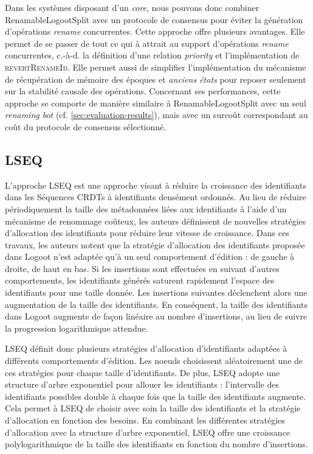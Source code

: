 \documentclass[12pt]{thesul}
\newcommand{\ie}{c.-à-d. }
\begin{document}
Dans les systèmes disposant d'un \emph{core}, nous pouvons donc combiner RenamableLogootSplit avec un protocole de consensus pour éviter la génération d'opérations \emph{rename} concurrentes.
Cette approche offre plusieurs avantages.
Elle permet de se passer de tout ce qui à attrait au support d'opérations \emph{rename} concurrentes, \ie la définition d'une relation \emph{priority} et l'implémentation de \textsc{revertRenameId}.
Elle permet aussi de simplifier l'implémentation du mécanisme de récupération de mémoire des époques et \emph{anciens états} pour reposer seulement sur la stabilité causale des opérations.
Concernant ses performances, cette approche se comporte de manière similaire à RenamableLogootSplit avec un seul \emph{renaming bot} (cf. \autoref{sec:evaluation-results}), mais avec un surcoût correspondant au coût du protocole de consensus sélectionné.

\subsection{LSEQ}

L'approche LSEQ \cite{lseq2013, lseq2017} est une approche visant à réduire la croissance des identifiants dans les Séquences \acp{CRDT} à identifiants densément ordonnés.
Au lieu de réduire périodiquement la taille des métadonnées liées aux identifiants à l'aide d'un mécanisme de renommage coûteux, les auteurs définissent de nouvelles stratégies d'allocation des identifiants pour réduire leur vitesse de croissance.
Dans ces travaux, les auteurs notent que la stratégie d'allocation des identifiants proposée dans Logoot \cite{WeissICDCS09} n'est adaptée qu'à un seul comportement d'édition : de gauche à droite, de haut en bas.
Si les insertions sont effectuées en suivant d'autres comportements, les identifiants générés saturent rapidement l'espace des identifiants pour une taille donnée.
Les insertions suivantes déclenchent alors une augmentation de la taille des identifiants.
En conséquent, la taille des identifiants dans Logoot augmente de façon linéaire au nombre d'insertions, au lieu de suivre la progression logarithmique attendue.

LSEQ définit donc plusieurs stratégies d'allocation d'identifiants adaptées à différents comportements d'édition.
Les noeuds choisissent aléatoirement une de ces stratégies pour chaque taille d'identifiants.
De plus, LSEQ adopte une structure d'arbre exponentiel pour allouer les identifiants : l'intervalle des identifiants possibles double à chaque fois que la taille des identifiants augmente.
Cela permet à LSEQ de choisir avec soin la taille des identifiants et la stratégie d'allocation en fonction des besoins.
En combinant les différentes stratégies d'allocation avec la structure d'arbre exponentiel, LSEQ offre une croissance polylogarithmique de la taille des identifiants en fonction du nombre d'insertions.
\end{document}
